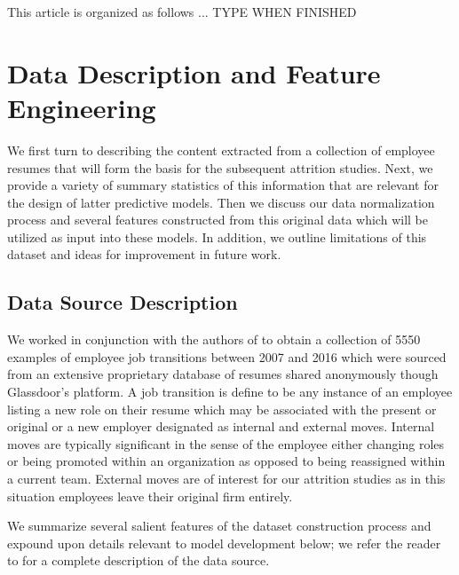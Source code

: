 \documentclass[10pt]{article}
\begin{document}
This article is organized as follows ... TYPE WHEN FINISHED 

\section{Data Description and Feature Engineering}

We first turn to describing the content extracted from a collection of 
employee resumes that will form the basis for the subsequent attrition studies. 
Next, we provide a variety of summary statistics of this information that 
are relevant for the design of latter predictive models.  Then we discuss 
our data normalization process and 
several features constructed from this original data which will be utilized 
as input into these models.
In addition, we outline limitations of this dataset and ideas for improvement  
in future work.

\subsection{Data Source Description}\label{datdes}

We worked in conjunction with the authors of \cite{Smart2016} to obtain 
a collection of 5550 examples of employee job transitions between 
2007 and 2016 which were sourced from an extensive proprietary database of 
resumes shared anonymously though Glassdoor's platform.  A job transition 
is define to be any instance of an employee listing a new role on their 
resume which may be associated with the present or original or a new employer
designated as internal and external moves.  Internal moves are typically 
significant in the sense of the employee either changing roles or 
being promoted within an organization as opposed to being reassigned 
within a current team. External moves are of interest for our 
attrition studies as in this situation employees leave their original 
firm entirely.

We summarize several salient features of the dataset construction process 
and expound upon details relevant to model development below; we refer the
reader to \cite{Smart2016} for a complete description of the data source. 
\end{document}
